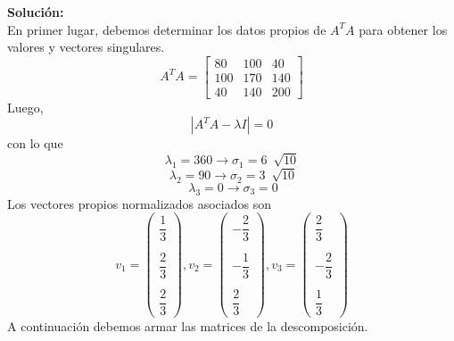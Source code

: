 \documentclass[12pt]{article}
\newenvironment{solucion}
{\begin{mdframed}[backgroundcolor=black!10]
		{\bf Solución:}\\
	}
	{
	\end{mdframed}
}
\newenvironment{preguntas}
{\begin{enumerate}\itemsep12pt
	}
	{
	\end{enumerate}
}
\newcommand{\ra}{\rightarrow}
\begin{document}
\begin{preguntas}
\begin{solucion}
		En primer lugar, debemos determinar los datos propios de $A^TA$ para obtener los valores y vectores singulares.
		$$A^TA = \begin{bmatrix}
		80 & 100 & 40 \\
		100 & 170 & 140\\
		40 & 140 & 200
		\end{bmatrix}$$
		Luego,
		$$|A^TA - \lambda I| = 0$$
		con lo que
		$$\lambda_1 = 360 \ra \sigma_1 = 6 \ \sqrt[]{10}$$
		$$\ \lambda_2 = 90  \ra \sigma_2 = 3 \ \sqrt[]{10}$$
		$$ \ \lambda_3 = 0  \ra \sigma_3 = 0$$
		Los vectores propios normalizados asociados son
		$$v_1 = \begin{pmatrix}
		\dfrac{1}{3}\\\\
		\dfrac{2}{3}\\\\
		\dfrac{2}{3}
		\end{pmatrix},
		v_2 = \begin{pmatrix}
		-\dfrac{2}{3}\\\\
		-\dfrac{1}{3}\\\\
		\dfrac{2}{3}
		\end{pmatrix},
		v_3 = \begin{pmatrix}
		\dfrac{2}{3}\\\\
		-\dfrac{2}{3}\\\\
		\dfrac{1}{3}
		\end{pmatrix}$$
		A continuación debemos armar las matrices de la descomposición.
		

\end{solucion}
\end{preguntas}
\end{document}
